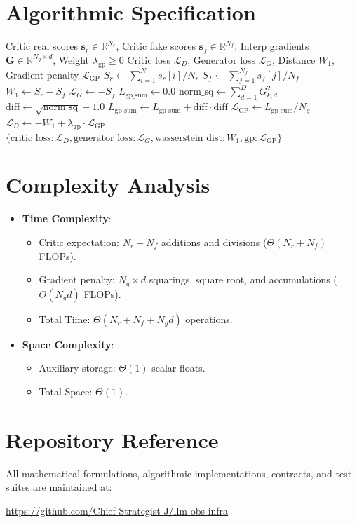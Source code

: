 \documentclass[11pt,a4paper]{article}
\theoremstyle{definition}
\begin{document}
\section{Algorithmic Specification}

\begin{algorithm}[H]
\caption{Wasserstein GAN with Gradient Penalty Loss Evaluation}
\label{alg:wgangp}
\begin{algorithmic}[1]
\Require Critic real scores $\mathbf{s}_r \in \mathbb{R}^{N_r}$, Critic fake scores $\mathbf{s}_f \in \mathbb{R}^{N_f}$, Interp gradients $\mathbf{G} \in \mathbb{R}^{N_g \times d}$, Weight $\lambda_{\text{gp}} \ge 0$
\Ensure Critic loss $\mathcal{L}_D$, Generator loss $\mathcal{L}_G$, Distance $W_1$, Gradient penalty $\mathcal{L}_{\text{GP}}$
\State $S_r \gets \sum_{i=1}^{N_r} s_r[i] / N_r$
\State $S_f \gets \sum_{j=1}^{N_f} s_f[j] / N_f$
\State $W_1 \gets S_r - S_f$
\State $\mathcal{L}_G \gets -S_f$
\State $L_{\text{gp\_sum}} \gets 0.0$
    \State $\text{norm\_sq} \gets \sum_{d=1}^D G_{k, d}^2$
    \State $\text{diff} \gets \sqrt{\text{norm\_sq}} - 1.0$
    \State $L_{\text{gp\_sum}} \gets L_{\text{gp\_sum}} + \text{diff} \cdot \text{diff}$
\EndFor
\State $\mathcal{L}_{\text{GP}} \gets L_{\text{gp\_sum}} / N_g$
\State $\mathcal{L}_D \gets -W_1 + \lambda_{\text{gp}} \cdot \mathcal{L}_{\text{GP}}$
\State \Return $\{\text{critic\_loss}: \mathcal{L}_D, \text{generator\_loss}: \mathcal{L}_G, \text{wasserstein\_dist}: W_1, \text{gp}: \mathcal{L}_{\text{GP}}\}$
\end{algorithmic}
\end{algorithm}

\section{Complexity Analysis}
\begin{itemize}
    \item \textbf{Time Complexity}:
    \begin{itemize}
        \item Critic expectation: $N_r + N_f$ additions and divisions ($\Theta(N_r + N_f)$ FLOPs).
        \item Gradient penalty: $N_g \times d$ squarings, square root, and accumulations ($\Theta(N_g d)$ FLOPs).
        \item Total Time: $\Theta(N_r + N_f + N_g d)$ operations.
    \end{itemize}
    \item \textbf{Space Complexity}:
    \begin{itemize}
        \item Auxiliary storage: $\Theta(1)$ scalar floats.
        \item Total Space: $\Theta(1)$.
    \end{itemize}
\end{itemize}

\section{Repository Reference}
All mathematical formulations, algorithmic implementations, contracts, and test suites are maintained at:
\begin{center}
\url{https://github.com/Chief-Strategist-J/llm-obs-infra}
\end{center}
\end{document}

